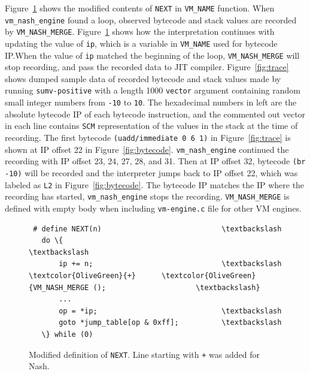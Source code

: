 \documentclass[preprint, 10pt]{sigplanconf}
\begin{document}
Figure~\hyperref[fig:cnext]{\ref{fig:cnext}} shows the modified contents of
\texttt{NEXT} in \texttt{VM\_NAME} function. When \texttt{vm\_nash\_engine}
found a loop, observed bytecode and stack values are recorded by
\texttt{VM\_NASH\_MERGE}. Figure~\hyperref[fig:cnext]{\ref{fig:cnext}} shows
how the interpretation continues with updating the value of \texttt{ip}, which
is a variable in \texttt{VM\_NAME} used for bytecode IP.\@ When the value of
\texttt{ip} matched the beginning of the loop, \texttt{VM\_NASH\_MERGE} will
stop recording, and pass the recorded data to JIT
compiler. Figure~\hyperref[fig:trace]{\ref{fig:trace}} shows dumped sample
data of recorded bytecode and stack values made by running
\texttt{sumv-positive} with a length 1000 \texttt{vector} argument containing
random small integer numbers from \texttt{-10} to \texttt{10}. The hexadecimal
numbers in left are the absolute bytecode IP of each bytecode instruction, and
the commented out vector in each line contains \texttt{SCM} representation of
the values in the stack at the time of recording.  The first bytecode
\texttt{(uadd/immediate 0 6 1)} in
Figure~\hyperref[fig:trace]{\ref{fig:trace}} is shown at IP offset 22 in
Figure~\hyperref[fig:bytecode]{\ref{fig:bytecode}}. \texttt{vm\_nash\_engine}
continued the recording with IP offset 23, 24, 27, 28, and 31. Then at IP
offset 32, bytecode \texttt{(br -10)} will be recorded and the interpreter
jumps back to IP offset 22, which was labeled as \texttt{L2} in
Figure~\hyperref[fig:bytecode]{\ref{fig:bytecode}}. The bytecode IP matches
the IP where the recording has started, \texttt{vm\_nash\_engine} stops the
recording. \texttt{VM\_NASH\_MERGE} is defined with empty body when including
\texttt{vm-engine.c} file for other VM engines.

\begin{figure}
  \centering
  \small
\begin{Verbatim}
 # define NEXT(n)                            \textbackslash
   do \{                                      \textbackslash
       ip += n;                              \textbackslash
\textcolor{OliveGreen}{+}      \textcolor{OliveGreen}{VM_NASH_MERGE ();                     \textbackslash}
       ...
       op = *ip;                             \textbackslash
       goto *jump_table[op & 0xff];          \textbackslash
   \} while (0)
\end{Verbatim}
\caption{Modified definition of \texttt{NEXT}. Line starting with \texttt{+} was
  added for Nash.}
\label{fig:cnext}
\end{figure}
\end{document}
